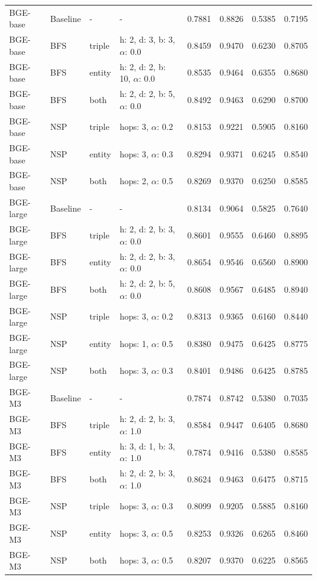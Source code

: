 \documentclass[11pt]{article}
\begin{document}
\begin{table}[t]
\begin{tabular}{llllcccc}
BGE-base & Baseline & - & - & 0.7881 & 0.8826 & 0.5385 & 0.7195 \\
BGE-base & BFS & triple & h: 2, d: 3, b: 3, $\alpha$: 0.0 & 0.8459 & 0.9470 & 0.6230 & 0.8705 \\
BGE-base & BFS & entity & h: 2, d: 2, b: 10, $\alpha$: 0.0 & 0.8535 & 0.9464 & 0.6355 & 0.8680 \\
BGE-base & BFS & both & h: 2, d: 2, b: 5, $\alpha$: 0.0 & 0.8492 & 0.9463 & 0.6290 & 0.8700 \\
BGE-base & NSP & triple & hops: 3, $\alpha$: 0.2 & 0.8153 & 0.9221 & 0.5905 & 0.8160 \\
BGE-base & NSP & entity & hops: 3, $\alpha$: 0.3 & 0.8294 & 0.9371 & 0.6245 & 0.8540 \\
BGE-base & NSP & both & hops: 2, $\alpha$: 0.5 & 0.8269 & 0.9370 & 0.6250 & 0.8585 \\

BGE-large & Baseline & - & - & 0.8134 & 0.9064 & 0.5825 & 0.7640 \\
BGE-large & BFS & triple & h: 2, d: 2, b: 3, $\alpha$: 0.0 & 0.8601 & 0.9555 & 0.6460 & 0.8895 \\
BGE-large & BFS & entity & h: 2, d: 2, b: 3, $\alpha$: 0.0 & 0.8654 & 0.9546 & 0.6560 & 0.8900 \\
BGE-large & BFS & both & h: 2, d: 2, b: 5, $\alpha$: 0.0 & 0.8608 & 0.9567 & 0.6485 & 0.8940 \\
BGE-large & NSP & triple & hops: 3, $\alpha$: 0.2 & 0.8313 & 0.9365 & 0.6160 & 0.8440 \\
BGE-large & NSP & entity & hops: 1, $\alpha$: 0.5 & 0.8380 & 0.9475 & 0.6425 & 0.8775 \\
BGE-large & NSP & both & hops: 3, $\alpha$: 0.3 & 0.8401 & 0.9486 & 0.6425 & 0.8785 \\

BGE-M3 & Baseline & - & - & 0.7874 & 0.8742 & 0.5380 & 0.7035 \\
BGE-M3 & BFS & triple & h: 2, d: 2, b: 3, $\alpha$: 1.0 & 0.8584 & 0.9447 & 0.6405 & 0.8680 \\
BGE-M3 & BFS & entity & h: 3, d: 1, b: 3, $\alpha$: 1.0 & 0.7874 & 0.9416 & 0.5380 & 0.8585 \\
BGE-M3 & BFS & both & h: 2, d: 2, b: 3, $\alpha$: 1.0 & 0.8624 & 0.9463 & 0.6475 & 0.8715 \\
BGE-M3 & NSP & triple & hops: 3, $\alpha$: 0.3 & 0.8099 & 0.9205 & 0.5885 & 0.8160 \\
BGE-M3 & NSP & entity & hops: 3, $\alpha$: 0.5 & 0.8253 & 0.9326 & 0.6265 & 0.8460 \\
BGE-M3 & NSP & both & hops: 3, $\alpha$: 0.5 & 0.8207 & 0.9370 & 0.6225 & 0.8565 \\


\end{tabular}
\end{table}
\end{document}
